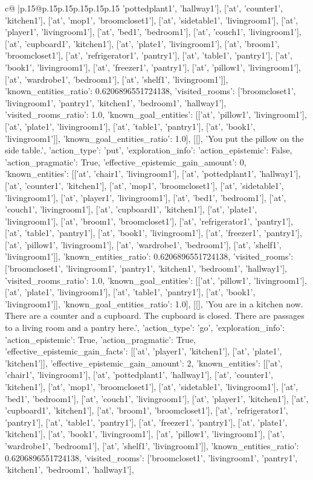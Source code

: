 \documentclass{article}
\begin{document}
{\begin{supertabular}{c@{$\;$}|p{.15\linewidth}@{}p{.15\linewidth}p{.15\linewidth}p{.15\linewidth}p{.15\linewidth}p{.15\linewidth}}
{{{'pottedplant1', 'hallway1'], ['at', 'counter1', 'kitchen1'], ['at', 'mop1', 'broomcloset1'], ['at', 'sidetable1', 'livingroom1'], ['at', 'player1', 'livingroom1'], ['at', 'bed1', 'bedroom1'], ['at', 'couch1', 'livingroom1'], ['at', 'cupboard1', 'kitchen1'], ['at', 'plate1', 'livingroom1'], ['at', 'broom1', 'broomcloset1'], ['at', 'refrigerator1', 'pantry1'], ['at', 'table1', 'pantry1'], ['at', 'book1', 'livingroom1'], ['at', 'freezer1', 'pantry1'], ['at', 'pillow1', 'livingroom1'], ['at', 'wardrobe1', 'bedroom1'], ['at', 'shelf1', 'livingroom1']], 'known_entities_ratio': 0.6206896551724138, 'visited_rooms': ['broomcloset1', 'livingroom1', 'pantry1', 'kitchen1', 'bedroom1', 'hallway1'], 'visited_rooms_ratio': 1.0, 'known_goal_entities': [['at', 'pillow1', 'livingroom1'], ['at', 'plate1', 'livingroom1'], ['at', 'table1', 'pantry1'], ['at', 'book1', 'livingroom1']], 'known_goal_entities_ratio': 1.0}}], [[], 'You put the pillow on the side table.', {'action_type': 'put', 'exploration_info': {'action_epistemic': False, 'action_pragmatic': True, 'effective_epistemic_gain_amount': 0, 'known_entities': [['at', 'chair1', 'livingroom1'], ['at', 'pottedplant1', 'hallway1'], ['at', 'counter1', 'kitchen1'], ['at', 'mop1', 'broomcloset1'], ['at', 'sidetable1', 'livingroom1'], ['at', 'player1', 'livingroom1'], ['at', 'bed1', 'bedroom1'], ['at', 'couch1', 'livingroom1'], ['at', 'cupboard1', 'kitchen1'], ['at', 'plate1', 'livingroom1'], ['at', 'broom1', 'broomcloset1'], ['at', 'refrigerator1', 'pantry1'], ['at', 'table1', 'pantry1'], ['at', 'book1', 'livingroom1'], ['at', 'freezer1', 'pantry1'], ['at', 'pillow1', 'livingroom1'], ['at', 'wardrobe1', 'bedroom1'], ['at', 'shelf1', 'livingroom1']], 'known_entities_ratio': 0.6206896551724138, 'visited_rooms': ['broomcloset1', 'livingroom1', 'pantry1', 'kitchen1', 'bedroom1', 'hallway1'], 'visited_rooms_ratio': 1.0, 'known_goal_entities': [['at', 'pillow1', 'livingroom1'], ['at', 'plate1', 'livingroom1'], ['at', 'table1', 'pantry1'], ['at', 'book1', 'livingroom1']], 'known_goal_entities_ratio': 1.0}}], [[], 'You are in a kitchen now. There are a counter and a cupboard. The cupboard is closed. There are passages to a living room and a pantry here.', {'action_type': 'go', 'exploration_info': {'action_epistemic': True, 'action_pragmatic': True, 'effective_epistemic_gain_facts': [['at', 'player1', 'kitchen1'], ['at', 'plate1', 'kitchen1']], 'effective_epistemic_gain_amount': 2, 'known_entities': [['at', 'chair1', 'livingroom1'], ['at', 'pottedplant1', 'hallway1'], ['at', 'counter1', 'kitchen1'], ['at', 'mop1', 'broomcloset1'], ['at', 'sidetable1', 'livingroom1'], ['at', 'bed1', 'bedroom1'], ['at', 'couch1', 'livingroom1'], ['at', 'player1', 'kitchen1'], ['at', 'cupboard1', 'kitchen1'], ['at', 'broom1', 'broomcloset1'], ['at', 'refrigerator1', 'pantry1'], ['at', 'table1', 'pantry1'], ['at', 'freezer1', 'pantry1'], ['at', 'plate1', 'kitchen1'], ['at', 'book1', 'livingroom1'], ['at', 'pillow1', 'livingroom1'], ['at', 'wardrobe1', 'bedroom1'], ['at', 'shelf1', 'livingroom1']], 'known_entities_ratio': 0.6206896551724138, 'visited_rooms': ['broomcloset1', 'livingroom1', 'pantry1', 'kitchen1', 'bedroom1', 'hallway1'], }}}
\end{supertabular}}
\end{document}
